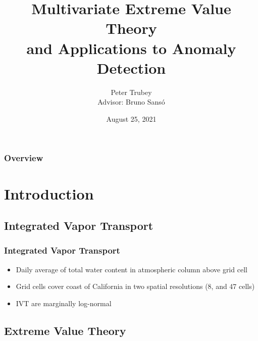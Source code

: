 \documentclass[aspectratio=169]{beamer}
\title{Multivariate Extreme Value Theory \\ and Applications to Anomaly Detection}
\author{Peter Trubey \\ Advisor: Bruno Sans{\'o}}
\institute{UCSC - Statistics Department}
\date[8/25/2021]{August 25, 2021}
\begin{document}
\begin{frame}[plain]
  \titlepage
\end{frame}

\begin{frame}[plain]
  \frametitle{Overview}
  \tableofcontents
\end{frame}

\section{Introduction}
\subsection{Integrated Vapor Transport}
\begin{frame}
  \frametitle{Integrated Vapor Transport}
  \begin{itemize}
    \item Daily average of total water content in atmospheric column above grid cell
    \item Grid cells cover coast of California in two spatial resolutions (8, and 47 cells)
    \item IVT are marginally log-normal
  \end{itemize}
\end{frame}

\subsection{Extreme Value Theory}
\end{document}

